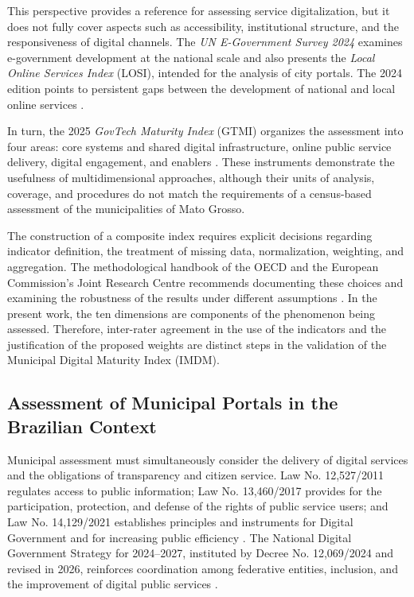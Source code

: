 \documentclass[12pt]{article}
\begin{document}
This perspective provides a reference for assessing service digitalization, but it does not fully cover aspects such as accessibility, institutional structure, and the responsiveness of digital channels. The \textit{UN E-Government Survey 2024} examines e-government development at the national scale and also presents the \textit{Local Online Services Index} (LOSI), intended for the analysis of city portals. The 2024 edition points to persistent gaps between the development of national and local online services \cite{un2024egovernment}. 

In turn, the 2025 \textit{GovTech Maturity Index} (GTMI) organizes the assessment into four areas: core systems and shared digital infrastructure, online public service delivery, digital engagement, and enablers \cite{worldbank2025gtmi}. These instruments demonstrate the usefulness of multidimensional approaches, although their units of analysis, coverage, and procedures do not match the requirements of a census-based assessment of the municipalities of Mato Grosso.

The construction of a composite index requires explicit decisions regarding indicator definition, the treatment of missing data, normalization, weighting, and aggregation. The methodological handbook of the OECD and the European Commission's Joint Research Centre recommends documenting these choices and examining the robustness of the results under different assumptions \cite{oecd2008}. In the present work, the ten dimensions are components of the phenomenon being assessed. Therefore, inter-rater agreement in the use of the indicators and the justification of the proposed weights are distinct steps in the validation of the Municipal Digital Maturity Index (IMDM).

\subsection{Assessment of Municipal Portals in the Brazilian Context}

Municipal assessment must simultaneously consider the delivery of digital services and the obligations of transparency and citizen service. Law No. 12,527/2011 regulates access to public information; Law No. 13,460/2017 provides for the participation, protection, and defense of the rights of public service users; and Law No. 14,129/2021 establishes principles and instruments for Digital Government and for increasing public efficiency \cite{brasil2011lei12527, brasil2017lei13460, brasil2021lei14129}. The National Digital Government Strategy for 2024--2027, instituted by Decree No. 12,069/2024 and revised in 2026, reinforces coordination among federative entities, inclusion, and the improvement of digital public services \cite{brasil2024decreto12069, brasil2026portaria5395}.
\end{document}
